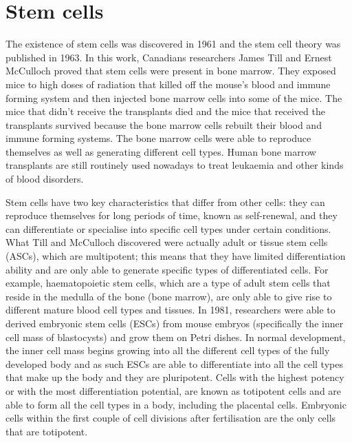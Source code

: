 \section{Stem cells}

The existence of stem cells was discovered in 1961 and the stem cell theory was published in 1963\cite{pmid13970094}. In this work, Canadians researchers James Till and Ernest McCulloch proved that stem cells were present in bone marrow. They exposed mice to high doses of radiation that killed off the mouse's blood and immune forming system and then injected bone marrow cells into some of the mice. The mice that didn't receive the transplants died and the mice that received the transplants survived because the bone marrow cells rebuilt their blood and immune forming systems. The bone marrow cells were able to reproduce themselves as well as generating different cell types. Human bone marrow transplants are still routinely used nowadays to treat leukaemia and other kinds of blood disorders.

Stem cells have two key characteristics that differ from other cells: they can reproduce themselves for long periods of time, known as self-renewal, and they can differentiate or specialise into specific cell types under certain conditions. What Till and McCulloch discovered were actually adult or tissue stem cells (ASCs), which are multipotent; this means that they have limited differentiation ability and are only able to generate specific types of differentiated cells. For example, haematopoietic stem cells, which are a type of adult stem cells that reside in the medulla of the bone (bone marrow), are only able to give rise to different mature blood cell types and tissues. In 1981, researchers were able to derived embryonic stem cells (ESCs) from mouse embryos (specifically the inner cell mass of blastocysts) and grow them on Petri dishes\cite{pmid7242681, pmid6950406}. In normal development, the inner cell mass begins growing into all the different cell types of the fully developed body and as such ESCs are able to differentiate into all the cell types that make up the body and they are pluripotent. Cells with the highest potency or with the most differentiation potential, are known as totipotent cells and are able to form all the cell types in a body, including the placental cells. Embryonic cells within the first couple of cell divisions after fertilisation are the only cells that are totipotent.

